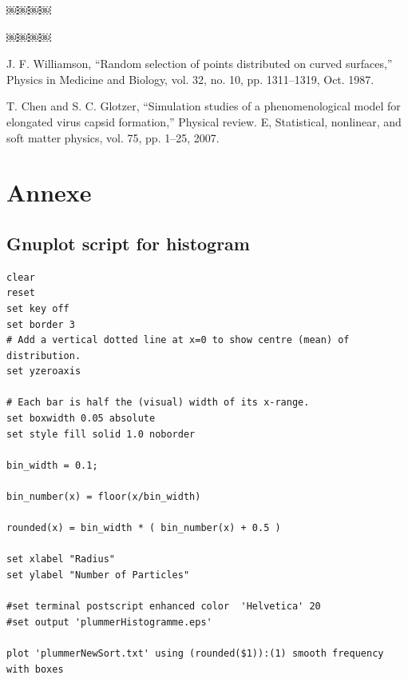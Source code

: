 \documentclass[10pt]{article}
\begin{document}

  ￼￼￼￼


  ￼￼￼￼
\newpage
\begin{thebibliography}{1}
 J. F. Williamson, “Random selection of points distributed on curved surfaces,” Physics in Medicine and Biology, vol. 32, no. 10, pp. 1311–1319, Oct. 1987.

 T. Chen and S. C. Glotzer, “Simulation studies of a phenomenological model for elongated virus capsid formation,” Physical review. E, Statistical, nonlinear, and soft matter physics, vol. 75, pp. 1–25, 2007.

\end{thebibliography}

\newpage
\section{Annexe}
\subsection{Gnuplot script for histogram}
\begin{verbatim}
clear
reset
set key off
set border 3
# Add a vertical dotted line at x=0 to show centre (mean) of distribution.
set yzeroaxis

# Each bar is half the (visual) width of its x-range.
set boxwidth 0.05 absolute
set style fill solid 1.0 noborder

bin_width = 0.1;

bin_number(x) = floor(x/bin_width)

rounded(x) = bin_width * ( bin_number(x) + 0.5 )

set xlabel "Radius"
set ylabel "Number of Particles"

#set terminal postscript enhanced color  'Helvetica' 20
#set output 'plummerHistogramme.eps'

plot 'plummerNewSort.txt' using (rounded($1)):(1) smooth frequency with boxes
\end{verbatim}
\end{document}
